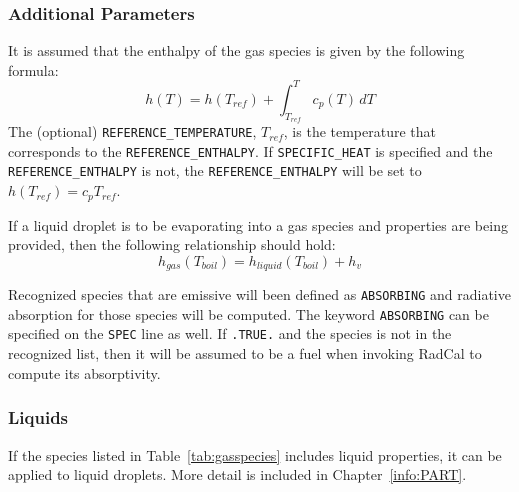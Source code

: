 \documentclass[11pt]{book}
\newcommand{\ct}{\tt\small}
\newcommand{\be}{\begin{equation}}
\newcommand{\ee}{\end{equation}}
\begin{document}
\subsubsection{Additional Parameters}

It is assumed that the enthalpy of the gas species is given by the following formula:
\be
   h(T) = h(T_{ref}) + \int_{T_{ref}}^T c_p(T) \, dT
\ee
The (optional) {\ct REFERENCE\_TEMPERATURE}, $T_{ref}$, is the temperature that corresponds to
the {\ct REFERENCE\_ENTHALPY}.  If {\ct SPECIFIC\_HEAT} is specified and the {\ct REFERENCE\_ENTHALPY} is not, the {\ct REFERENCE\_ENTHALPY} will be set to $h(T_{ref})=c_p T_{ref}$.

If a liquid droplet is to be evaporating into a gas species and properties are being provided, then the following relationship should hold:
\be h_{gas}(T_{boil}) = h_{liquid}(T_{boil}) + h_v \ee

Recognized species that are emissive will been defined as {\ct ABSORBING} and radiative absorption for those species
will be computed.  The keyword {\ct ABSORBING} can be specified on the {\ct SPEC} line as well.  If {\ct .TRUE.} and the
species is not in the recognized list, then it will be assumed to be a fuel when invoking RadCal to compute its
absorptivity.


\subsubsection{Liquids}

If the species listed in Table~\ref{tab:gasspecies} includes liquid properties, it can be applied to liquid droplets. More detail is included in Chapter~\ref{info:PART}.
\end{document}
